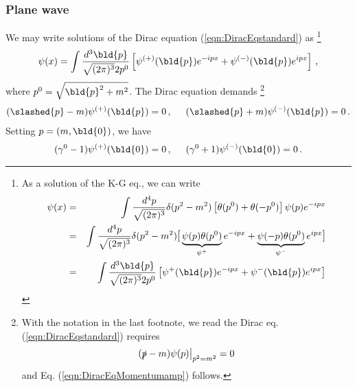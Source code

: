 \bigskip

\bigskip

\subsubsection{Plane wave}

We may write solutions of the Dirac equation (\ref{eqn:DiracEqstandard}) as
\footnote{%
As  a solution of the K-G eq., we can write
\begin{eqnarray*}
\psi(x) &=& \int \frac{d^4 p}{\sqrt{(2\pi)^3}}
\delta(p^2 - m^2) 
 \left[
 \theta(p^0) +  \theta(-p^0) \right]
 \psi(p) e^{-ipx}
\\
&=&
\int \frac{d^4 p}{\sqrt{(2\pi)^3}}
\delta(p^2 - m^2)  
{\large \mbox{[}}
\underbrace{\psi(p)\theta(p^0)}_{\psi^{+}}  e^{-ipx} + 
\underbrace{\psi(-p)\theta(p^0)}_{\psi^{-}}  e^{ipx}
{\large \mbox{]}}
\\
&=&
\int \frac{d^3 \bld{p}}{\sqrt{(2\pi)^3}2p^0}
\left[
\psi^{+}(\bld{p})  e^{-ipx} + \psi^{-}(\bld{p})  e^{ipx}
\right]
\end{eqnarray*}
}%
\begin{eqnarray}
\psi(x) = \int \frac{d^3 \bld{p}}{\sqrt{(2\pi)^3} 2 p^0}
 \left[
\psi^{(+)}(\bld{p}) e^{-ipx} + \psi^{(-)}(\bld{p}) e^{ipx}
\right]\,,
\label{eqn:Diracfieldbypsipm}
\end{eqnarray}
where $p^0 = \sqrt{\bld{p}^2 + m^2}$.
The Dirac equation demands
\footnote{%
With the notation in the last footnote, we read
the Dirac eq. (\ref{eqn:DiracEqstandard}) requires
\begin{eqnarray*}
\left. (\slashed{p} - m) \psi(p) \right|_{p^2 = m^2} = 0\,
\end{eqnarray*}
and Eq. (\ref{eqn:DiracEqMomentumamp}) follows.
}%
\begin{eqnarray}
(\slashed{p} - m) \psi^{(+)}(\bld{p}) = 0\,,
\hspace{5mm}
(\slashed{p} + m) \psi^{(-)}(\bld{p}) = 0 \,.
\label{eqn:DiracEqMomentumamp}
\end{eqnarray}
Setting $p = (m, \bld{0})$, we have 
\begin{eqnarray}
(\gamma^0 - 1) \psi^{(+)}(\bld{0}) = 0\,,
\hspace{5mm}
(\gamma^0 + 1) \psi^{(-)}(\bld{0}) = 0 \,.
\label{eqn:DiracEqMomentumampatzeromomentum}
\end{eqnarray}
